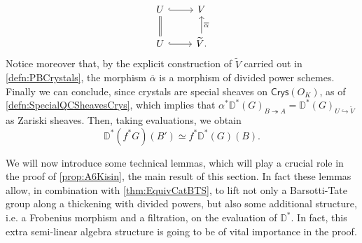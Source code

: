 \begin{rem}
\begin{equation*}
	\begin{tikzcd}
		U \arrow[r, "", hookrightarrow] &
		V \\
		U \arrow[u, "", equal] 
		\arrow[r, "", hookrightarrow] &
		\widetilde{V} \arrow[u, "\overline{\alpha}"', rightarrow] 
	.\end{tikzcd}
	\end{equation*}
	Notice moreover that, by the explicit construction of \(\widetilde{V}\)
	carried out in \cref{defn:PBCrystals}, the morphism \(\overline{\alpha}\)
	is a morphism of divided power schemes.
	Finally we can conclude, since crystals are special sheaves on
	\(\mathsf{Crys}(O_K)\), as of \cref{defn:SpecialQCSheavesCrys},
	which implies that \(\alpha^*\mathbb{D}^*(G)_{ B \twoheadrightarrow A } =
	\mathbb{D}^*(G)_{ U \hookrightarrow \widetilde{V} }\) as Zariski sheaves.
	Then, taking evaluations,
	we obtain
	\begin{equation*}
		\mathbb{D}^*(f^*G)(B') \simeq f^* \mathbb{D}^*(G)(B) 
	.\end{equation*}
\end{rem}


\begin{rem}[]
	We will now introduce some technical lemmas, which will play a crucial role
	in the proof of \cref{prop:A6Kisin},
	the main result of this section.
	In fact these lemmas allow, in combination with \cref{thm:EquivCatBTS},
	to lift not only a Barsotti-Tate group along a thickening with divided
	powers, but also some additional structure, i.e.
	a Frobenius morphism and a filtration, on the evaluation of $\mathbb{D}^*$.
	In fact, this extra semi-linear algebra structure is going to 
	be of vital importance in the proof.
\end{rem}


